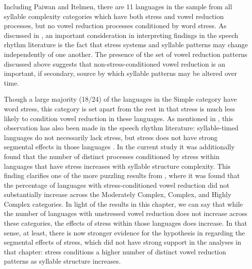   Including Paiwan and Itelmen, there are 11 languages in the sample from all syllable complexity categories which have both stress and vowel reduction processes, but no vowel reduction processes conditioned by word stress. As discussed in , an important consideration in interpreting findings in the speech rhythm literature is the fact that stress systems and syllable patterns may change independently of one another. The presence of the set of vowel reduction patterns discussed above suggests that non-stress-conditioned vowel reduction is an important, if secondary, source by which syllable patterns may be altered over time.

  Though a large majority (18/24) of the languages in the Simple category have word stress, this category is set apart from the rest in that stress is much less likely to condition vowel reduction in these languages. As mentioned in , this observation has also been made in the speech rhythm literature: syllable-timed languages do not necessarily lack stress, but stress does not have strong segmental effects in those languages \citep{Auer1993}. In the current study it was additionally found that the number of distinct processes conditioned by stress within languages that have stress increases with syllable structure complexity. This finding clarifies one of the more puzzling results from , where it was found that the percentage of languages with stress-conditioned vowel reduction did not substantially increase across the Moderately Complex, Complex, and Highly Complex categories. In light of the results in this chapter, we can say that while the number of languages with unstressed vowel reduction does not increase across these categories, the effects of stress within those languages does increase. In that sense, at least, there is now stronger evidence for the hypothesis in  regarding the segmental effects of stress, which did not have strong support in the analyses in that chapter: stress conditions a higher number of distinct vowel reduction patterns as syllable structure increases.

